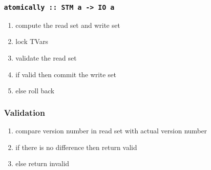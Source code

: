 \documentclass{beamer}
\begin{document}
%   
  \begin{frame}
   \frametitle{\lstinline{atomically :: STM a -> IO a}}
   \begin{enumerate}\setlength\itemsep{1em}
    \item compute the read set and write set
    \item lock TVars
    \item validate the read set
    \item if valid then commit the write set
    \item else roll back
   \end{enumerate}
  \end{frame}

  \begin{frame}
   \frametitle{Validation}
    \begin{enumerate}\setlength\itemsep{1em}
      \item compare version number in read set with actual version number
      \item if there is no difference then return valid 
      \item else return invalid
    \end{enumerate}
  \end{frame}

\end{document}
